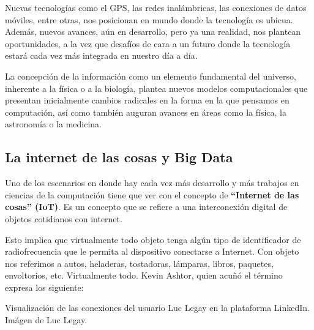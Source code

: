 Nuevas tecnologías como el GPS, las redes inalámbricas, las conexiones de datos
móviles, entre otras, nos posicionan en mundo donde la tecnología es ubicua.
Además, nuevos avances, aún en desarrollo, pero ya una realidad, nos plantean
oportunidades, a la vez que desafíos de cara a un futuro donde la tecnología
estará cada vez más integrada en nuestro día a día.

La concepción de la información como un elemento fundamental del universo,
inherente a la física o a la biología, plantea nuevos modelos computacionales
que presentan inicialmente cambios radicales en la forma en la que pensamos en
computación, así como también auguran avances en áreas como la física, la
astronomía o la medicina.

\subsection{La internet de las cosas y Big Data}

Uno de los escenarios en donde hay cada vez más desarrollo y más trabajos
en ciencias de la computación tiene que ver con el concepto de \textbf{``Internet
de las cosas'' (IoT)}. Es un concepto que se refiere a una interconexión digital
de objetos cotidianos con internet.\autocite{iot_2008}

Esto implica que virtualmente todo objeto tenga algún tipo de identificador de
radiofrecuencia que le permita al dispositivo conectarse a Internet. Con objeto
nos referimos a autos, heladeras, tostadoras, lámparas, libros, paquetes,
envoltorios, etc. Virtualmente todo. Kevin Ashtor, quien acuñó el término
expresa los siguiente:

{Visualización de las conexiones del usuario Luc Legay en la plataforma LinkedIn.}
{Imágen de Luc Legay.}

